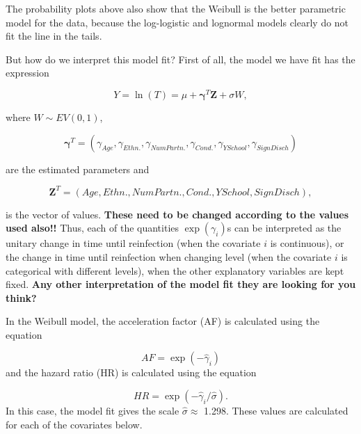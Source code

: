 \documentclass[
]{article}
\begin{document}
The probability plots above also show that the Weibull is the better parametric model for the data, because the log-logistic and lognormal models clearly do not fit the line in the tails.

But how do we interpret this model fit? First of all, the model we have fit has the expression

\[
Y = \ln(T) = \mu + \mathbf{\gamma}^T\mathbf{Z} + \sigma W,  
\]

where \(W \sim EV(0,1)\),

\[
\mathbf{\gamma}^T = (\gamma_{Age}, \gamma_{Ethn.}, \gamma_{NumPartn.}, \gamma_{Cond.}, \gamma_{YSchool}, \gamma_{SignDisch}) 
\]

are the estimated parameters and

\[
\mathbf{Z}^T = (Age, Ethn., NumPartn., Cond., YSchool, SignDisch), 
\]

is the vector of values. \textbf{These need to be changed according to the values used also!!} Thus, each of the quantities \(\exp(\gamma_i)\)s can be interpreted as the unitary change in time until reinfection (when the covariate \(i\) is continuous), or the change in time until reinfection when changing level (when the covariate \(i\) is categorical with different levels), when the other explanatory variables are kept fixed. \textbf{Any other interpretation of the model fit they are looking for you think?}

In the Weibull model, the acceleration factor (AF) is calculated using the equation

\[
AF = \exp(-\hat{\gamma}_i)
\]
and the hazard ratio (HR) is calculated using the equation

\[
HR = \exp(-\hat{\gamma}_i/\hat{\sigma}).
\]
In this case, the model fit gives the scale \(\hat{\sigma} \approx\) 1.298. These values are calculated for each of the covariates below.
\end{document}
